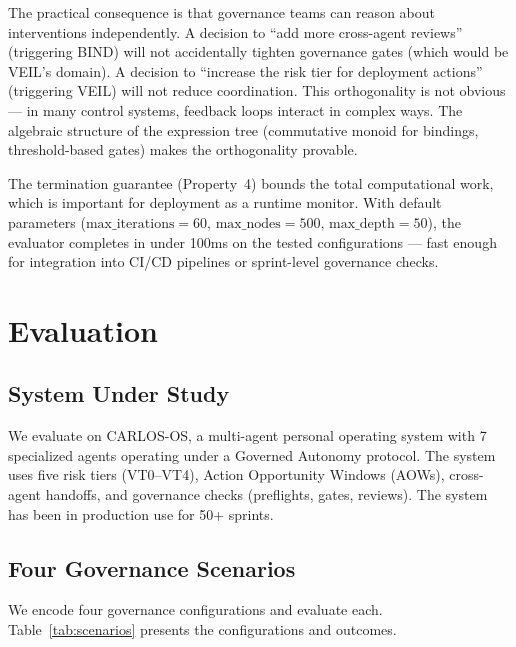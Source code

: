 \documentclass[sigconf,nonacm]{acmart}
\begin{document}
The practical consequence is that governance teams can reason about
interventions independently. A decision to ``add more cross-agent reviews''
(triggering BIND) will not accidentally tighten governance gates (which
would be VEIL's domain). A decision to ``increase the risk tier for
deployment actions'' (triggering VEIL) will not reduce coordination.
This orthogonality is not obvious --- in many control systems, feedback
loops interact in complex ways. The algebraic structure of the expression
tree (commutative monoid for bindings, threshold-based gates) makes
the orthogonality provable.

The termination guarantee (Property~4) bounds the total computational
work, which is important for deployment as a runtime monitor. With
default parameters ($\mathrm{max\_iterations} = 60$, $\mathrm{max\_nodes}
= 500$, $\mathrm{max\_depth} = 50$), the evaluator completes in under
100ms on the tested configurations --- fast enough for integration into
CI/CD pipelines or sprint-level governance checks.


\section{Evaluation}\label{sec:eval}

\subsection{System Under Study}

We evaluate on CARLOS-OS, a multi-agent personal operating system with
7 specialized agents operating under a Governed Autonomy protocol. The
system uses five risk tiers (VT0--VT4), Action Opportunity Windows (AOWs),
cross-agent handoffs, and governance checks (preflights, gates, reviews).
The system has been in production use for 50+ sprints.

\subsection{Four Governance Scenarios}

We encode four governance configurations and evaluate each.
Table~\ref{tab:scenarios} presents the configurations and outcomes.
\end{document}
